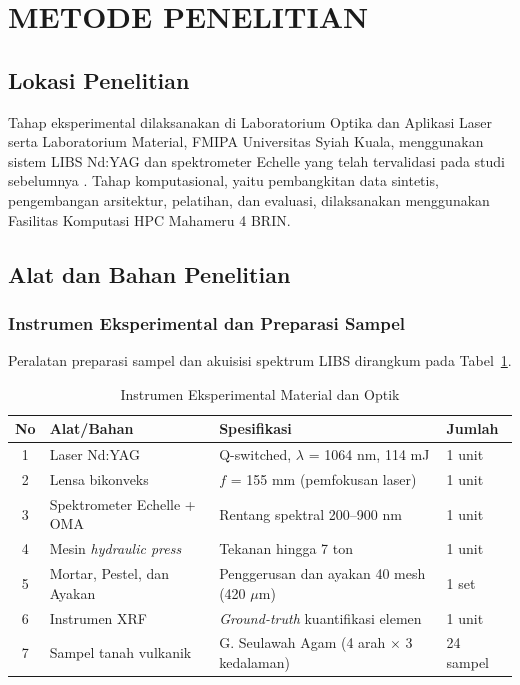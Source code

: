 \documentclass[12pt, a4paper]{article}
\begin{document}
\section{METODE PENELITIAN}

\subsection{Lokasi Penelitian}

Tahap eksperimental dilaksanakan di Laboratorium Optika dan Aplikasi Laser serta Laboratorium Material, FMIPA Universitas Syiah Kuala, menggunakan sistem LIBS Nd:YAG dan spektrometer Echelle yang telah tervalidasi pada studi sebelumnya \citep{mitaphonna_characteristics_2023, mitaphonna_pulsed_2024}. Tahap komputasional, yaitu pembangkitan data sintetis, pengembangan arsitektur, pelatihan, dan evaluasi, dilaksanakan menggunakan Fasilitas Komputasi HPC Mahameru 4 BRIN.

\subsection{Alat dan Bahan Penelitian}

\subsubsection{Instrumen Eksperimental dan Preparasi Sampel}

Peralatan preparasi sampel dan akuisisi spektrum LIBS dirangkum pada Tabel~\ref{tab:alat-bahan}.
\begin{table}[htbp]
\centering
\caption{Instrumen Eksperimental Material dan Optik}
\label{tab:alat-bahan}
\small
\begin{tabular}{|c|l|p{5.5cm}|l|}
\hline
No & Alat/Bahan & Spesifikasi & Jumlah \\
\hline
1  & Laser Nd:YAG              & Q-switched, $\lambda$ = 1064 nm, 114 mJ   & 1 unit \\
\hline
2  & Lensa bikonveks           & $f$ = 155 mm (pemfokusan laser)            & 1 unit \\
\hline
3  & Spektrometer Echelle + OMA& Rentang spektral 200--900 nm               & 1 unit \\
\hline
4  & Mesin \textit{hydraulic press} & Tekanan hingga 7 ton                  & 1 unit \\
\hline
5  & Mortar, Pestel, dan Ayakan& Penggerusan dan ayakan 40 mesh (420 $\mu$m) & 1 set  \\
\hline
6  & Instrumen XRF             & \textit{Ground-truth} kuantifikasi elemen  & 1 unit \\
\hline
7  & Sampel tanah vulkanik     & G. Seulawah Agam (4 arah $\times$ 3 kedalaman) & 24 sampel \\
\hline
\end{tabular}
\end{table}
\end{document}
